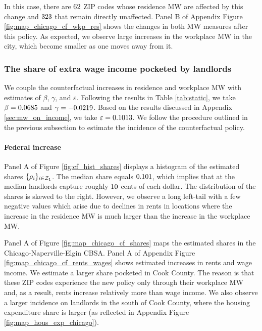 In this case, there are $\textnormal{62}$ ZIP codes whose 
residence MW are affected by this change and $\textnormal{323}$ 
that remain directly unaffected.
Panel B of Appendix Figure \ref{fig:map_chicago_cf_wkp_res} shows the changes 
in both MW measures after this policy.
As expected, we observe large increases in the workplace MW in the city, 
which become smaller as one moves away from it.

\subsubsection{The share of extra wage income pocketed by landlords}
\label{sec:cf_rents_and_wage_changes}

We couple the counterfactual increases in residence and workplace MW with 
estimates of $\beta$, $\gamma$, and $\varepsilon$.
Following the results in Table \ref{tab:static}, we take 
$\beta = 0.0685$ and 
$\gamma = -0.0219$.
Based on the results discussed in Appendix \ref{sec:mw_on_income}, we take
$\varepsilon = 0.1013$.
We follow the procedure outlined in the previous subsection to estimate the 
incidence of the counterfactual policy.

\paragraph{Federal increase}

Panel A of Figure \ref{fig:cf_hist_shares} displays a histogram of the
estimated shares $\{\rho_i\}_{i\in\mathcal{Z}_1}$.
The median share equals $\textnormal{0.101}$, which implies that at the 
median landlords capture roughly $\textnormal{10}$ cents of each dollar.
The distribution of the shares is skewed to the right.
However, we observe a long left-tail with a few negative values which arise due 
to declines in rents in locations where the increase in the residence MW is much 
larger than the increase in the workplace MW.

Panel A of Figure \ref{fig:map_chicago_cf_shares} maps the estimated shares 
in the Chicago-Naperville-Elgin CBSA.
Panel A of Appendix Figure \ref{fig:map_chicago_cf_rents_wages} shows
estimated increases in rents and wage income.
We estimate a larger share pocketed in Cook County.
The reason is that these ZIP codes experience the new policy only through
their workplace MW and, as a result, rents increase relatively more than
wage income.
We also observe a larger incidence on landlords in the south of Cook County,
where the housing expenditure share is larger 
(as reflected in Appendix Figure \ref{fig:map_hous_exp_chicago}).

